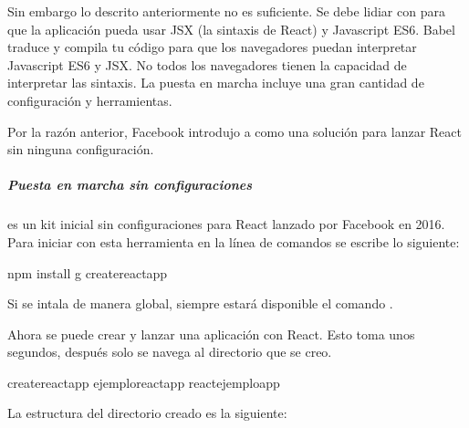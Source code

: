 Sin embargo lo descrito anteriormente no es suficiente. Se debe lidiar con
 para que la aplicación pueda usar JSX (la sintaxis de React) y
Javascript ES6. Babel traduce y compila tu código para que los navegadores
puedan interpretar Javascript ES6 y JSX. No todos los navegadores tienen la
capacidad de interpretar las sintaxis. La puesta en marcha
incluye una gran cantidad de configuración y herramientas.

Por la razón anterior, Facebook introdujo  a como una solución
para lanzar React sin ninguna configuración.


\subparagraph{Puesta en marcha sin configuraciones}
\label{\detokenize{reactjs:puesta-en-marcha-sin-configuraciones}}
 es un kit inicial sin configuraciones para React lanzado
por Facebook en 2016. Para iniciar con esta herramienta en la línea de comandos
se escribe lo siguiente:

%
\begin{sphinxVerbatim}[commandchars=\\\{\}]
npm install \PYGZhy{}g create\PYGZhy{}react\PYGZhy{}app
\end{sphinxVerbatim}

Si se intala de manera global, siempre estará disponible el comando
.

Ahora se puede crear y lanzar una aplicación con React. Esto toma unos segundos,
después solo se navega al directorio que se creo.

%
\begin{sphinxVerbatim}[commandchars=\\\{\}]
create\PYGZhy{}react\PYGZhy{}app ejemplo\PYGZus{}react\PYGZus{}app
 react\PYGZus{}ejemplo\PYGZus{}app
\end{sphinxVerbatim}

La estructura del directorio creado es la siguiente:

